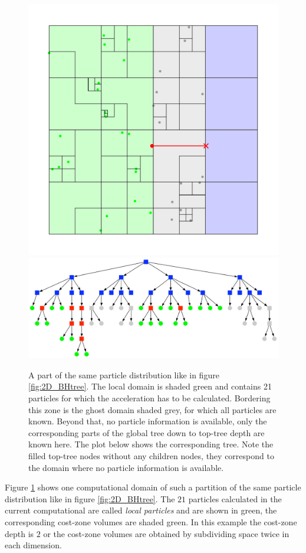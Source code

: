 \begin{figure}[htbp]
\begin{center}
\includegraphics[scale=0.6]{quadtree50_xy_TPL2.pdf}
\includegraphics[scale=0.3]{quadtree50_TPL2_stage3.pdf}
\caption{A part of the same particle distribution like in figure \ref{fig:2D_BHtree}. The local domain is shaded green and contains 21 particles for which the acceleration has to be calculated. Bordering this zone is the ghost domain shaded grey, for which all particles are known. Beyond that, no particle information is available, only the corresponding parts of the global tree down to top-tree depth are known here. The plot below shows the corresponding tree. Note the filled top-tree nodes without any children nodes, they correspond to the domain where no particle information is available.}
\label{fig:2D_BHtree_costzone}
\end{center}
\end{figure}
Figure \ref{fig:2D_BHtree_costzone} shows one computational domain of such a partition of the same particle distribution like in figure \ref{fig:2D_BHtree}. The $21$ particles calculated in the current computational are called \emph{local particles} and are shown in green, the corresponding cost-zone volumes are shaded green. In this example the cost-zone depth is $2$ or the cost-zone volumes are obtained by subdividing space twice in each dimension. \\


